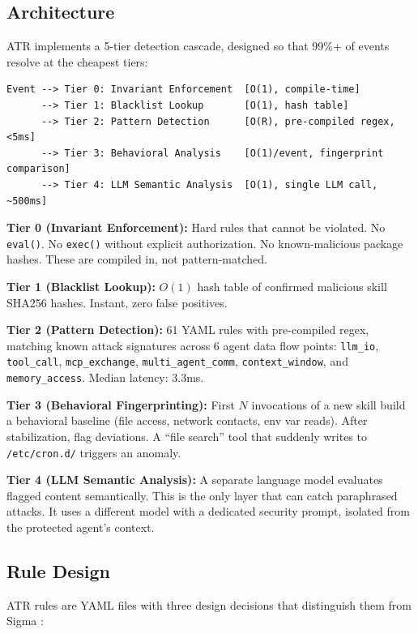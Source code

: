 \documentclass[11pt,letterpaper]{article}
\begin{document}
\subsection{Architecture}

ATR implements a 5-tier detection cascade, designed so that 99\%+ of events resolve at the cheapest tiers:

\begin{lstlisting}
Event --> Tier 0: Invariant Enforcement  [O(1), compile-time]
      --> Tier 1: Blacklist Lookup       [O(1), hash table]
      --> Tier 2: Pattern Detection      [O(R), pre-compiled regex, <5ms]
      --> Tier 3: Behavioral Analysis    [O(1)/event, fingerprint comparison]
      --> Tier 4: LLM Semantic Analysis  [O(1), single LLM call, ~500ms]
\end{lstlisting}

\textbf{Tier 0 (Invariant Enforcement):} Hard rules that cannot be violated. No \texttt{eval()}. No \texttt{exec()} without explicit authorization. No known-malicious package hashes. These are compiled in, not pattern-matched.

\textbf{Tier 1 (Blacklist Lookup):} $O(1)$ hash table of confirmed malicious skill SHA256 hashes. Instant, zero false positives.

\textbf{Tier 2 (Pattern Detection):} 61 YAML rules with pre-compiled regex, matching known attack signatures across 6 agent data flow points: \texttt{llm\_io}, \texttt{tool\_call}, \texttt{mcp\_exchange}, \texttt{multi\_agent\_comm}, \texttt{context\_window}, and \texttt{memory\_access}. Median latency: 3.3ms.

\textbf{Tier 3 (Behavioral Fingerprinting):} First $N$ invocations of a new skill build a behavioral baseline (file access, network contacts, env var reads). After stabilization, flag deviations. A ``file search'' tool that suddenly writes to \texttt{/etc/cron.d/} triggers an anomaly.

\textbf{Tier 4 (LLM Semantic Analysis):} A separate language model evaluates flagged content semantically. This is the only layer that can catch paraphrased attacks. It uses a different model with a dedicated security prompt, isolated from the protected agent's context.

\subsection{Rule Design}

ATR rules are YAML files with three design decisions that distinguish them from Sigma \cite{sigma}:
\end{document}
